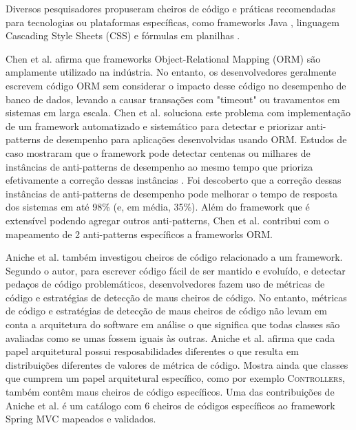 Diversos pesquisadores propuseram cheiros de código e práticas recomendadas para tecnologias ou plataformas específicas, como frameworks Java \cite{AA, FinavaroAniche2016}, linguagem Cascading Style Sheets (CSS) \cite{CSSCodeSmell} e fórmulas em planilhas \cite{54}.

Chen et al. \cite{AA} afirma que frameworks Object-Relational Mapping (ORM) são amplamente utilizado na indústria. No entanto, os desenvolvedores geralmente escrevem código ORM sem considerar o impacto desse código no desempenho de banco de dados, levando a causar transações com "timeout" ou travamentos em sistemas em larga escala. Chen et al. \cite{AA} soluciona este problema com implementação de um framework automatizado e sistemático para detectar e priorizar anti-patterns de desempenho para aplicações desenvolvidas usando ORM. Estudos de caso mostraram que o framework pode detectar centenas ou milhares de instâncias de anti-patterns de desempenho ao mesmo tempo que prioriza efetivamente a correção dessas instâncias \cite{AA}. Foi descoberto que a correção dessas instâncias de anti-patterns de desempenho pode melhorar o tempo de resposta dos sistemas em até 98\% (e, em média, 35\%). Além do framework que é extensível podendo agregar outros anti-patterns, Chen et al. \cite{AA} contribui com o mapeamento de 2 anti-patterns específicos a frameworks ORM.

Aniche et al. \cite{FinavaroAniche2016} também investigou cheiros de código relacionado a um framework. Segundo o autor, para escrever código fácil de ser mantido e evoluído, e detectar pedaços de código problemáticos, desenvolvedores fazem uso de métricas de código e estratégias de detecção de maus cheiros de código. No entanto, métricas de código e estratégias de detecção de maus cheiros de código não levam em conta a arquitetura do software em análise o que significa que todas classes são avaliadas como se umas fossem iguais às outras. Aniche et al. \cite{FinavaroAniche2016} afirma que cada papel arquitetural possui resposabilidades diferentes o que resulta em distribuições diferentes de valores de métrica de código. Mostra ainda que classes que cumprem um papel arquitetural específico, como por exemplo \textsc{Controllers}, também contêm maus cheiros de código específicos. Uma das contribuições de Aniche et al. é um catálogo com 6 cheiros de códigos específicos ao framework Spring MVC mapeados e validados.

